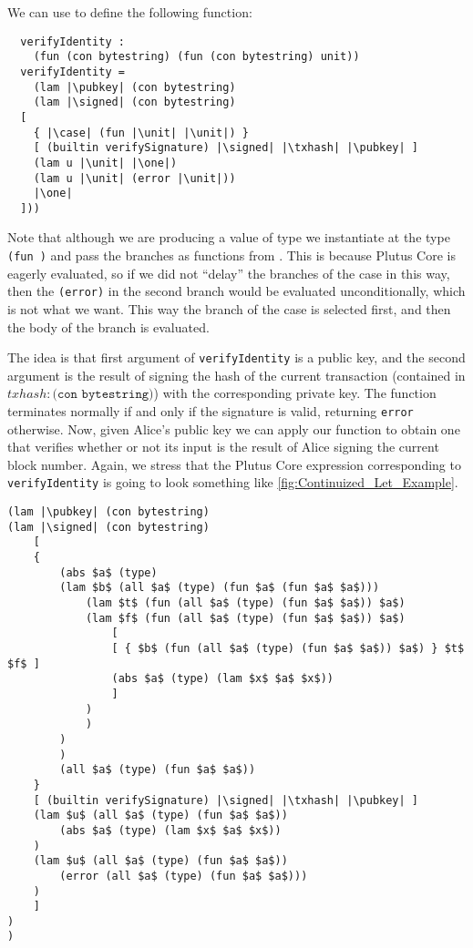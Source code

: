 \documentclass[../plutus-core-specification.tex]{subfiles}
\begin{document}
\noindent We can use \case{} to define the following function:
\begin{lstlisting}
  verifyIdentity :
    (fun (con bytestring) (fun (con bytestring) unit))
  verifyIdentity =
    (lam |\pubkey| (con bytestring)
    (lam |\signed| (con bytestring)
  [
    { |\case| (fun |\unit| |\unit|) }
    [ (builtin verifySignature) |\signed| |\txhash| |\pubkey| ]
    (lam u |\unit| |\one|)
    (lam u |\unit| (error |\unit|))
    |\one|
  ]))
\end{lstlisting}
 Note that although we are producing a value of
type \unit{} we instantiate \case{} at the type \texttt{(fun \unit \unit)} and
pass the branches as functions from \unit{}. This
is because Plutus Core is eagerly evaluated, so if we did not ``delay'' the
branches of the case in this way, then the \texttt{(error)} in the second branch
would be evaluated unconditionally, which is not what we want. This way the
branch of the case is selected first, and then the body of the branch is
evaluated.

The idea is that first argument of \texttt{verifyIdentity} is a public key, and the second
argument is the result of signing the hash of the current transaction
(contained in $\mathit{txhash} : \texttt{(con bytestring)}$) with
the corresponding private key. The function terminates normally if and only if the
signature is valid, returning \texttt{error} otherwise. Now, given
Alice's public key we can apply our function to obtain one that
verifies whether or not its input is the result of Alice signing the
current block number. Again, we stress that the Plutus Core expression
corresponding to \texttt{verifyIdentity} is going to look something
like \cref{fig:Continuized_Let_Example}.

\begin{figure*}[h]  %
\begin{lstlisting}
(lam |\pubkey| (con bytestring)
(lam |\signed| (con bytestring)
    [
    {
        (abs $a$ (type)
        (lam $b$ (all $a$ (type) (fun $a$ (fun $a$ $a$)))
            (lam $t$ (fun (all $a$ (type) (fun $a$ $a$)) $a$)
            (lam $f$ (fun (all $a$ (type) (fun $a$ $a$)) $a$)
                [
                [ { $b$ (fun (all $a$ (type) (fun $a$ $a$)) $a$) } $t$ $f$ ]
                (abs $a$ (type) (lam $x$ $a$ $x$))
                ]
            )
            )
        )
        )
        (all $a$ (type) (fun $a$ $a$))
    }
    [ (builtin verifySignature) |\signed| |\txhash| |\pubkey| ]
    (lam $u$ (all $a$ (type) (fun $a$ $a$))
        (abs $a$ (type) (lam $x$ $a$ $x$))
    )
    (lam $u$ (all $a$ (type) (fun $a$ $a$))
        (error (all $a$ (type) (fun $a$ $a$)))
    )
    ]
)
)
\end{lstlisting}
\caption{Example of Section 5 written out in full}
\label{fig:Continuized_Let_Example}
\end{figure*}
\end{document}
